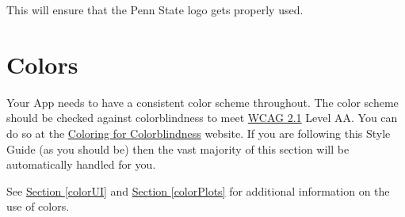 \documentclass[
]{book}
\newenvironment{Shaded}{\begin{snugshade}}{\end{snugshade}}
\newcommand{\CommentTok}[1]{\textcolor[rgb]{0.56,0.35,0.01}{\textit{#1}}}
\newcommand{\DataTypeTok}[1]{\textcolor[rgb]{0.13,0.29,0.53}{#1}}
\newcommand{\DecValTok}[1]{\textcolor[rgb]{0.00,0.00,0.81}{#1}}
\newcommand{\KeywordTok}[1]{\textcolor[rgb]{0.13,0.29,0.53}{\textbf{#1}}}
\newcommand{\NormalTok}[1]{#1}
\newcommand{\OperatorTok}[1]{\textcolor[rgb]{0.81,0.36,0.00}{\textbf{#1}}}
\newcommand{\StringTok}[1]{\textcolor[rgb]{0.31,0.60,0.02}{#1}}
\begin{document}
\begin{Shaded}
\end{Shaded}

This will ensure that the Penn State logo gets properly used.

\hypertarget{colors-2}{%
\section{Colors}\label{colors-2}}

Your App needs to have a consistent color scheme throughout. The color scheme should be checked against colorblindness to meet \href{https://www.w3.org/WAI/WCAG21/quickref/}{WCAG 2.1} Level AA. You can do so at the \href{https://davidmathlogic.com/colorblind/\#\%23000000-\%23E69F00-\%2356B4E9-\%23009E73-\%23F0E442-\%230072B2-\%23D55E00-\%23CC79A7}{Coloring for Colorblindness} website. If you are following this Style Guide (as you should be) then the vast majority of this section will be automatically handled for you.

See \protect\hyperlink{colorUI}{Section \ref{colorUI}} and \protect\hyperlink{colorPlots}{Section \ref{colorPlots}} for additional information on the use of colors.
\end{document}
